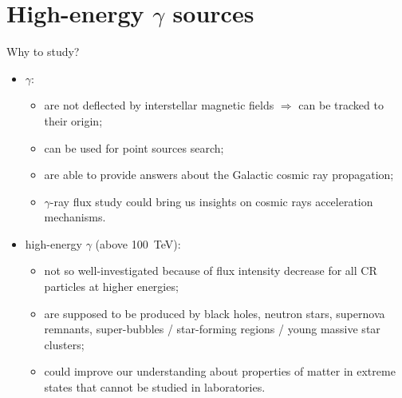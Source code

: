 
\begin{frame}
\titlepage
\end{frame}

\section{High-energy \texorpdfstring{$\gamma$}{gamma} sources}

\begin{frame}{Why to study?}
  \begin{itemize}
    \item $\gamma$:
    \begin{itemize}
	\item are not deflected by interstellar magnetic fields $\Rightarrow$ can be tracked to their origin;
	\item can be used for point sources search;
	\item are able to provide answers about the Galactic cosmic ray propagation;
	\item $\gamma$-ray flux study could bring us insights on cosmic rays acceleration mechanisms.
    \end{itemize}
    \item high-energy $\gamma$ (above 100~TeV):
    \begin{itemize}
	\item not so well-investigated because of flux intensity decrease for all CR particles at higher energies;
	\item are supposed to be produced by black holes, neutron stars, supernova remnants, super-bubbles / star-forming regions / young massive star clusters;
	\item could improve our understanding about properties of matter in extreme states that cannot be studied in laboratories.
    \end{itemize}
  \end{itemize}
\end{frame}

